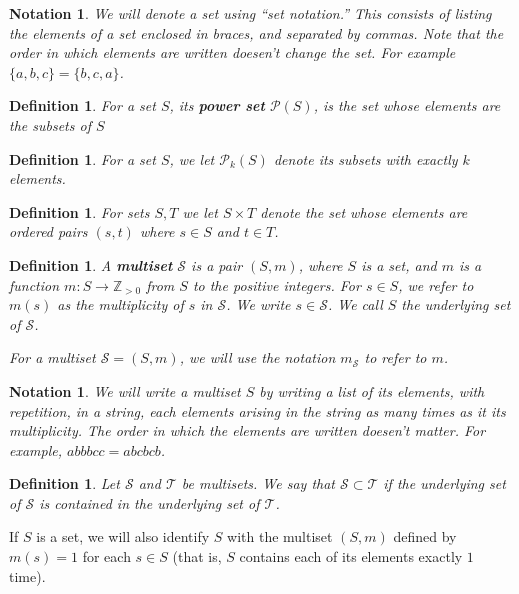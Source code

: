 \documentclass[12pt]{report}
\theoremstyle{plain}
\newtheorem{defn}[thm]{Definition}
\newtheorem{notn}[thm]{Notation}
\newcommand{\ms}[1]{\mathscr #1}
\newcommand{\Xb}[1]{\textbf{#1}\index{#1}}
\begin{document}
\begin{notn}
We will denote a set using ``set notation.'' This consists of listing the
elements of a set enclosed in braces, and separated by commas. Note that
the order in which elements are written doesen't change the set. For
example $\{a, b, c\} = \{b, c, a\}$.
\end{notn}

\begin{defn}
For a set $S$, its \Xb{power set} $\ms P(S)$, is the set whose
elements are the subsets of $S$
\end{defn}

\begin{defn}
For a set $S$, we let $\ms P_k(S)$ denote its subsets with exactly $k$
elements.
\end{defn}

\begin{defn}
For sets $S, T$ we let $S \times T$ denote the set whose elements are
ordered pairs $(s, t)$ where $s \in S$ and $t \in T$.
\end{defn}

\begin{defn}
A \Xb{multiset} $\ms S$ is a pair $(S, m)$, where $S$ is a set, and $m$ is a
function $m: S \to \mathbb Z_{> 0}$ from $S$ to the positive integers. For
$s \in S$, we refer to $m(s)$ as the multiplicity of $s$ in $\ms S$. We
write $s \in \ms S$. We call $S$ the underlying set of $\ms S$.

For a multiset $\ms S = (S, m)$, we will use the notation $m_{\ms S}$ to
refer to $m$.
\end{defn}

\begin{notn}
We will write a multiset $S$ by writing a list of its elements, with
repetition, in a string, each elements arising in the string as many times
as it its multiplicity. The order in which the elements are written
doesen't matter. For example, $abbbcc = abcbcb$.
\end{notn}

\begin{defn}
Let $\ms S$ and $\ms T$ be multisets. We say that $\ms S \subset \ms T$ if
the underlying set of $\ms S$ is contained in the underlying set of $\ms
T$.
\end{defn}

If $S$ is a set, we will also identify $S$ with the multiset $(S, m)$
defined by $m(s) = 1$ for each $s \in S$ (that is, $S$ contains each of its
elements exactly $1$ time).
\end{document}
